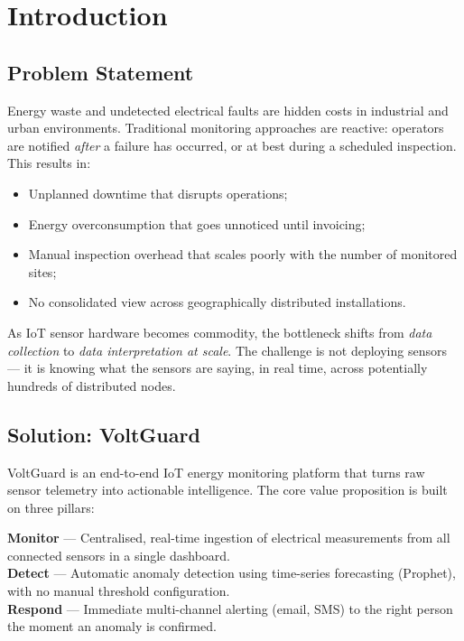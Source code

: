 \documentclass[12pt,a4paper,oneside]{report}
\begin{document}
\setcounter{page}{2}

\tableofcontents

\clearpage
{}

\chapter{Introduction}

\section{Problem Statement}

Energy waste and undetected electrical faults are hidden costs in industrial and urban environments. Traditional monitoring approaches are reactive: operators are notified \emph{after} a failure has occurred, or at best during a scheduled inspection. This results in:

\begin{itemize}[noitemsep]
  \item Unplanned downtime that disrupts operations;
  \item Energy overconsumption that goes unnoticed until invoicing;
  \item Manual inspection overhead that scales poorly with the number of monitored sites;
  \item No consolidated view across geographically distributed installations.
\end{itemize}

As IoT sensor hardware becomes commodity, the bottleneck shifts from \emph{data collection} to \emph{data interpretation at scale}. The challenge is not deploying sensors — it is knowing what the sensors are saying, in real time, across potentially hundreds of distributed nodes.

\section{Solution: VoltGuard}

VoltGuard is an end-to-end IoT energy monitoring platform that turns raw sensor telemetry into actionable intelligence. The core value proposition is built on three pillars:

\begin{callout}
\textbf{Monitor} — Centralised, real-time ingestion of electrical measurements from all connected sensors in a single dashboard. \\
\textbf{Detect} — Automatic anomaly detection using time-series forecasting (Prophet), with no manual threshold configuration. \\
\textbf{Respond} — Immediate multi-channel alerting (email, SMS) to the right person the moment an anomaly is confirmed.
\end{callout}
\end{document}
